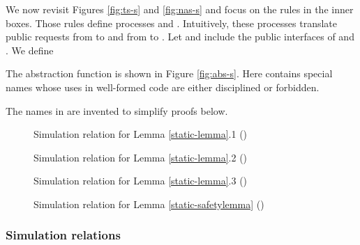 \documentclass[10pt]{article}
\begin{document}
We now revisit Figures \ref{fig:ts-s} and \ref{fig:nas-s} and focus on the rules in the inner boxes. Those rules define processes  and . Intuitively, these processes translate public requests from  to  and from  to . Let  and  include the public interfaces of  and . We define 

The abstraction function  is shown in Figure \ref{fig:abs-s}. Here  contains special names whose uses in well-formed code are either disciplined or forbidden. 

The names in  are invented to simplify proofs below.
\begin{figure}
\hspace{-0.5cm}\fbox{\parbox{13.0cm}{\small







}}
\caption{Simulation relation for Lemma \ref{static-lemma}.1 ()}
\label{fig:simreln-1-s}
\end{figure}
\begin{figure}
\hspace{-0.4cm}\fbox{\parbox{12.8cm}{\small




}}
\caption{Simulation relation for Lemma \ref{static-lemma}.2 ()}
\label{fig:simreln-2-s}
\end{figure}
\begin{figure}
\hspace{-0.5cm}\fbox{\parbox{13.0cm}{\small












}}
\caption{Simulation relation for Lemma \ref{static-lemma}.3 ()}
\label{fig:simreln-3-s}
\end{figure}

\begin{figure}[h]
\hspace{-0.5cm}\fbox{\parbox{13.0cm}{\small






}}
\caption{Simulation relation for Lemma \ref{static-safetylemma} ()}
\label{fig:simreln-4-s}
\end{figure}

\subsubsection{Simulation relations}
\end{document}
